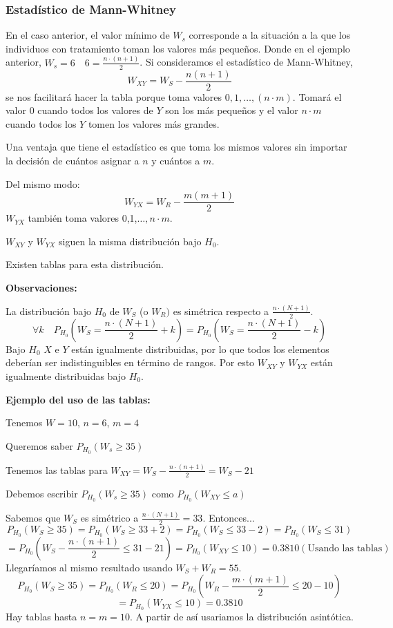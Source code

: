 \subsubsection{Estadístico de Mann-Whitney}

En el caso anterior, el valor mínimo de $W_s$ corresponde a la situación a la que los individuos con tratamiento toman los valores más pequeños. Donde en el ejemplo anterior, $W_s=6 \quad 6=\frac{n \cdot (n+1)}{2}$.
Si consideramos el estadístico de Mann-Whitney,
\[
    W_{XY}=W_S-\frac{n(n+1)}{2}
\]
se nos facilitará hacer la tabla porque toma valores $0,1,\dots,(n \cdot m)$. Tomará el valor 0 cuando todos los valores de $Y$ son los más pequeños y el valor $n\cdot m$  cuando todos los $Y$ tomen los valores más grandes.

Una ventaja que tiene el estadístico es que toma los mismos valores sin importar la decisión de cuántos asignar a $n$ y cuántos a $m$.

Del mismo modo:
\[
    W_{YX}=W_R-\frac{m(m+1)}{2}
\]
$W_{YX}$ también toma valores 0,1,$\dots,n \cdot m$.

\noindent $W_{XY}$ y $W_{YX}$ siguen la misma distribución bajo $H_0$.

\noindent Existen tablas para esta distribución.

\vspace{2mm}

\noindent \textbf{Observaciones:}

La distribución bajo $H_0$ de $W_S$ (o $W_R)$ es simétrica respecto a $\frac{n \cdot (N+1)}{2}$.
\[
    \forall k \quad P_{H_0} \left( W_S=\frac{n \cdot (N+1)}{2}+k\right)=
    P_{H_0} \left( W_S=\frac{n \cdot (N+1)}{2}-k\right)
\]
Bajo $H_0$ $X$ e $Y$ están igualmente distribuidas, por lo que todos los elementos deberían ser indistinguibles en término de rangos. Por esto $W_{XY}$ y $W_{YX}$ están igualmente distribuidas bajo $H_0$.

\vspace{2mm}

\textbf{Ejemplo del uso de las tablas:}

\noindent Tenemos $W=10$, $n=6$, $m=4$

\noindent Queremos saber $P_{H_0}(W_s \geq 35)$

\noindent Tenemos las tablas para $W_{XY}=W_S-\frac{n \cdot (n+1)}{2}=W_S-21$

\noindent Debemos escribir $P_{H_0}(W_s \geq 35)$ como $P_{H_0}(W_{XY} \leq a)$

\noindent Sabemos que $W_S$ es simétrico a $\frac{n \cdot (N+1)}{2}=33$. Entonces...
\[
    P_{H_0}(W_S \geq 35)= P_{H_0}(W_S \geq 33+2)=P_{H_0}(W_S \leq 33-2)=P_{H_0}(W_S \leq 31)
\]
\[
    =P_{H_0}\left(W_S-\frac{n \cdot (n+1)}{2} \leq 31-21\right)= P_{H_0} (W_{XY} \leq 10)=0.3810 (\text{Usando las tablas})
\]
Llegaríamos al mismo resultado usando $W_S+W_R=55$.
\[
    P_{H_0}(W_S \geq 35)= P_{H_0}(W_R \leq 20)= P_{H_0} \left( W_R - \frac{m \cdot (m+1)}{2} \leq 20-10\right)
\]
\[
    = P_{H_0} (W_{YX} \leq 10)=0.3810
\]
Hay tablas hasta $n=m=10$. A partir de así usariamos la distribución asintótica.

